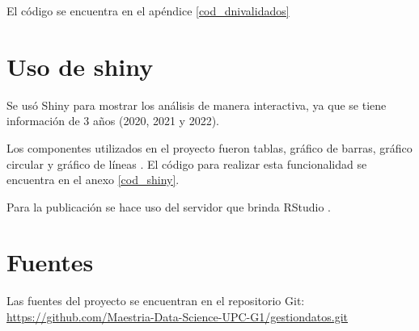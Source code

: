 El código se encuentra en el apéndice \ref{cod_dnivalidados}

\section{Uso de shiny}

Se usó Shiny \parencite{ShinyRef} para mostrar los análisis de manera interactiva, ya que se tiene información de 3 años (2020, 2021 y 2022). 

Los componentes utilizados en el proyecto fueron tablas, gráfico de barras, gráfico circular y gráfico de líneas \parencite{RBook1}.
El código para realizar esta funcionalidad se encuentra en el anexo \ref{cod_shiny}.

Para la publicación se hace uso del servidor que brinda RStudio \parencite{ShinyAppRef}.
 
\section{Fuentes}
Las fuentes del proyecto se encuentran en el repositorio Git: \url{https://github.com/Maestria-Data-Science-UPC-G1/gestiondatos.git}